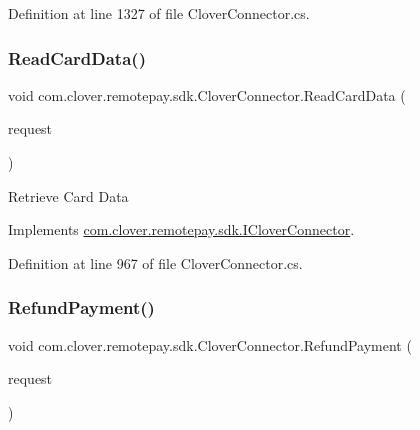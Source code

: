 Definition at line 1327 of file Clover\+Connector.\+cs.

\mbox{\label{classcom_1_1clover_1_1remotepay_1_1sdk_1_1_clover_connector_a0901566c92bbce70865b3ae144e42cdc}} 
\subsubsection{\texorpdfstring{Read\+Card\+Data()}{ReadCardData()}}
{\footnotesize\ttfamily void com.\+clover.\+remotepay.\+sdk.\+Clover\+Connector.\+Read\+Card\+Data (\begin{DoxyParamCaption}\item[{\hyperlink{classcom_1_1clover_1_1remotepay_1_1sdk_1_1_read_card_data_request}{Read\+Card\+Data\+Request}}]{request }\end{DoxyParamCaption})}



Retrieve Card Data 



Implements \hyperlink{interfacecom_1_1clover_1_1remotepay_1_1sdk_1_1_i_clover_connector_a841db6225c6a5df5e04918d9e2648fd1}{com.\+clover.\+remotepay.\+sdk.\+I\+Clover\+Connector}.



Definition at line 967 of file Clover\+Connector.\+cs.

\mbox{\label{classcom_1_1clover_1_1remotepay_1_1sdk_1_1_clover_connector_a55f368cbaa89e2a8c47da3ba4a3a80aa}} 
\subsubsection{\texorpdfstring{Refund\+Payment()}{RefundPayment()}}
{\footnotesize\ttfamily void com.\+clover.\+remotepay.\+sdk.\+Clover\+Connector.\+Refund\+Payment (\begin{DoxyParamCaption}\item[{\hyperlink{classcom_1_1clover_1_1remotepay_1_1sdk_1_1_refund_payment_request}{Refund\+Payment\+Request}}]{request }\end{DoxyParamCaption})}



